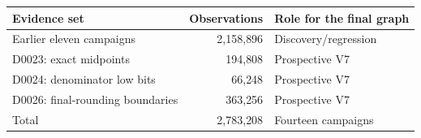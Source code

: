 \begin{tabular}{@{}lrl@{}}
\toprule
Evidence set & Observations & Role for the final graph \\
\midrule
Earlier eleven campaigns & 2{,}158{,}896 & Discovery/regression \\
D0023: exact midpoints & 194{,}808 & Prospective V7 \\
D0024: denominator low bits & 66{,}248 & Prospective V7 \\
D0026: final-rounding boundaries & 363{,}256 & Prospective V7 \\
\midrule
Total & 2{,}783{,}208 & Fourteen campaigns \\
\bottomrule
\end{tabular}

